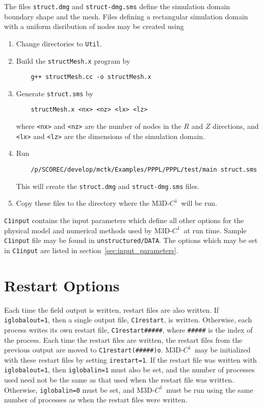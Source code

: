 \documentclass[letterpaper]{book}
\newcommand{\codename}{M3D-$C^1$}
\begin{document}
The files \texttt{struct.dmg} and \texttt{struct-dmg.sms} define the
simulation domain boundary shape and the mesh.  Files defining a
rectangular simulation domain with a uniform disribution of nodes may
be created using
\begin{enumerate}
\item Change directories to \texttt{Util}.
\item Build the \texttt{structMesh.x} program by 
  \begin{verbatim}
    g++ structMesh.cc -o structMesh.x
  \end{verbatim}
\item Generate \texttt{struct.sms} by
  \begin{verbatim}
    structMesh.x <nx> <nz> <lx> <lz>
  \end{verbatim}
  where \texttt{<nx>} and \texttt{<nz>} are the number of nodes in the
  $R$ and $Z$ directions, and \texttt{<lx>} and \texttt{<lz>} are the
  dimensions of the simulation domain.
\item Run 
  \begin{verbatim}
    /p/SCOREC/develop/mctk/Examples/PPPL/PPPL/test/main struct.sms
  \end{verbatim} 
  This will create the \texttt{struct.dmg} and \texttt{struct-dmg.sms}
  files.
\item Copy these files to the directory where the \codename\ will be
  run.
\end{enumerate}

\texttt{C1input} contains the input parameters which define all other
options for the physical model and numerical methods used by
\codename\ at run time.  Sample \texttt{C1input} file may be found in
\texttt{unstructured/DATA}.  The options which may be set in
\texttt{C1input} are listed in section~\ref{sec:input_parameters}.


\section{Restart Options}

Each time the field output is written, restart files are also written.
If \texttt{iglobalout=1}, then a single output file,
\texttt{C1restart}, is written.  Otherwise, each process writes its
own restart file, \texttt{C1restart\#\#\#\#\#}, where
\texttt{\#\#\#\#\#} is the index of the process.  Each time the
restart files are written, the restart files from the previous output
are moved to \texttt{C1restart(\#\#\#\#\#)o}.  \codename\ may be
initialized with these restart files by setting \texttt{irestart=1}.
If the restart file was written with \texttt{iglobalout=1}, then
\texttt{iglobalin=1} must also be set, and the number of processes
used need not be the same as that used when the restart file was
written.  Otherwise, \texttt{iglobalin=0} must be set, and
\codename\ must be run using the same number of processes as when the
restart files were written.
\end{document}
